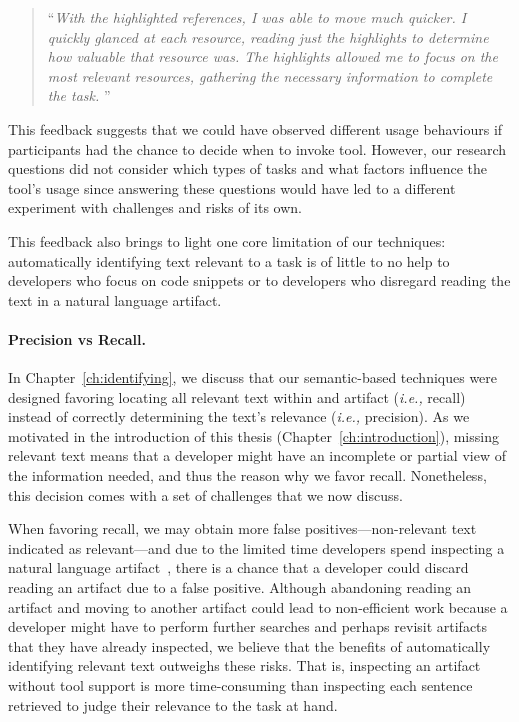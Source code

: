 \begin{footnotesize}
\begin{quote}
    ``\textit{With the highlighted references, I was able to move much quicker. I quickly glanced at each resource, reading just the highlights to determine how valuable that resource was. The highlights allowed me to focus on the most relevant resources, gathering the necessary information to complete the task. 
}''
\end{quote}
\end{footnotesize}





\smallskip
This feedback suggests that we could have observed different usage behaviours if participants had the chance to decide when to invoke \acs{tool}.
However, 
our research questions did not consider
 which types of tasks 
and what factors  influence the tool's usage
since answering these questions would have led to a different experiment with challenges and risks of its own.



This feedback also brings to light one core limitation of our techniques:
automatically identifying text relevant to a task is of little to no help
to developers who focus on code snippets or to developers who disregard 
reading the text in a natural language artifact.




\paragraph{\textbf{Precision vs Recall.}}

In Chapter~\ref{ch:identifying}, we discuss that our semantic-based techniques were designed favoring locating all relevant text within and
artifact (\textit{i.e.,} recall) instead of 
correctly determining the text's relevance (\textit{i.e.,} precision). 
As we motivated in the introduction of this thesis (Chapter~\ref{ch:introduction}),
missing relevant text means that a developer might have an incomplete or partial view of the information needed,
and thus the reason why we favor recall. 
Nonetheless, this decision comes with a set of challenges that we now discuss.


When favoring recall,  we may obtain more false positives---non-relevant text indicated as relevant---and
due to the limited time developers spend inspecting a natural language artifact~\cite{Starke2009}, there is a chance that
 a developer could discard reading an artifact due to a false positive. 
 Although abandoning reading an artifact and moving to another artifact could lead to non-efficient work 
 because
a developer might have to perform further searches and perhaps revisit artifacts that they have already inspected,
we believe that the benefits of automatically identifying relevant text outweighs these risks. 
That is, inspecting an artifact without tool support is more time-consuming
than inspecting each sentence retrieved to judge their relevance to the task at hand. 




